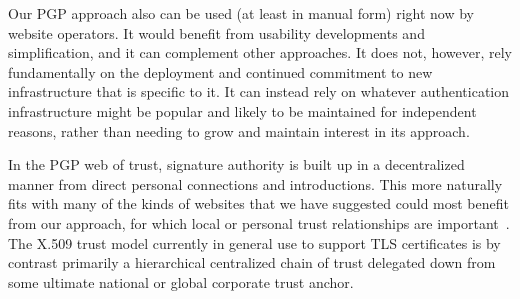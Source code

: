 \documentclass[10pt, conference, compsocconf]{styles/IEEEtran}
\begin{document}

Our PGP approach also can be used (at least in manual form) right now by
website operators. It would benefit from usability developments
and simplification, and it can complement other approaches. It does not,
however,
rely fundamentally on the deployment and continued commitment to new
infrastructure that is specific to it.  It can instead
rely on whatever authentication infrastructure might be popular
and likely to be maintained for independent reasons, rather than
needing to grow and maintain interest in its approach.


In the PGP web of trust, signature authority is built up in a
decentralized manner from direct personal connections and
introductions. This more naturally fits with many of the kinds of
websites that we have suggested could most benefit from our approach,
for which local or personal trust relationships are
important~\cite{zimmerman}.  The X.509 trust model currently in
general use to support TLS certificates is by contrast primarily a
hierarchical centralized chain of trust delegated down from some
ultimate national or global corporate trust anchor.
\end{document}
